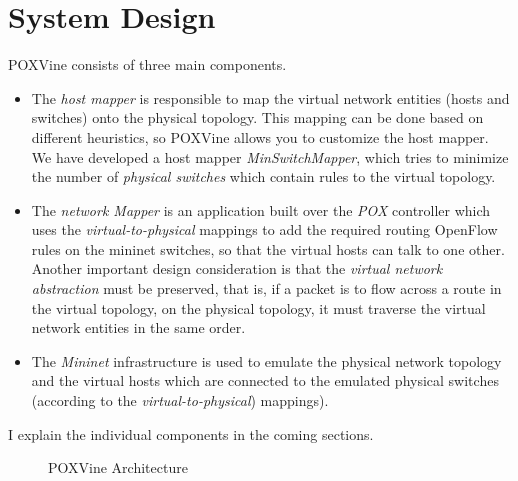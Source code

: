 \chapter{System Design}
POXVine consists of three main components.
\begin{itemize}
	\item The \emph{host mapper} is responsible to map the virtual network entities (hosts and switches) onto the physical topology. This mapping can be done based on different heuristics, so POXVine allows you to customize the host mapper. We have developed a host mapper \emph{MinSwitchMapper}, which tries to minimize the number of \emph{physical switches} which contain rules to the virtual topology.
	
	\item The \emph{network Mapper} is an application built over the \emph{POX} controller which uses the \emph{virtual-to-physical} mappings to add the required routing OpenFlow rules on the mininet switches, so that the virtual hosts can talk to one other. Another important design consideration is that the \emph{virtual network abstraction} must be preserved, that is, if a packet is to flow across a route in the virtual topology, on the physical topology, it must traverse the virtual network entities in the same order.
	
	\item The \emph{Mininet} infrastructure is used to emulate the physical network topology and the virtual hosts which are connected to the emulated physical switches (according to the \emph{virtual-to-physical}) mappings). 	
\end{itemize}  
I explain the individual components in the coming sections.


\begin{figure}
	\noindent
	\caption{POXVine Architecture}
\end{figure}


